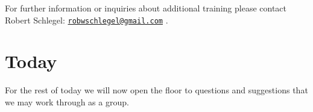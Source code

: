 \documentclass[]{book}
\theoremstyle{definition}
\theoremstyle{definition}
\theoremstyle{definition}
\theoremstyle{remark}
\begin{document}
For further information or inquiries about additional training please
contact Robert Schlegel:
\href{mailto:robwschlegel@gmail.com}{\nolinkurl{robwschlegel@gmail.com}}
.

\section{Today}\label{today}

For the rest of today we will now open the floor to questions and
suggestions that we may work through as a group.


\end{document}
